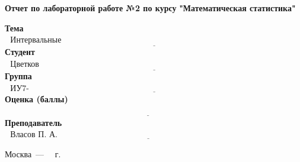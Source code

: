 \begin{titlepage}
	\begin{center}
		\noindent\begin{minipage}{1.3\textwidth}\centering
		\Large\textbf{Отчет по лабораторной работе №2 по курсу}\newline
		\textbf{"Математическая статистика"}\newline\newline\newline
		\end{minipage}
	\end{center}
	

	\noindent\textbf{Тема}           $\underline{\text{~~Интервальные оценки~~~~~~~~~~~~~~~~~~~~~~~~~~~~~~~~~~~~~~~~~~~~~~~~~~~~~~~~~~~~~~~~~~~~~~~~~~~~~~~~~~~~~~~~}}$\newline\newline
	\noindent\textbf{Студент}        $\underline{\text{~~Цветков И.А.~~~~~~~~~~~~~~~~~~~~~~~~~~~~~~~~~~~~~~~~~~~~~~~~~~~~~~~~~~~~~~~~~~~~~~~~~~~~~~~~~~~~~~~~~~~~~~~}}$\newline\newline
	\noindent\textbf{Группа}         $\underline{\text{~~ИУ7-63Б~~~~~~~~~~~~~~~~~~~~~~~~~~~~~~~~~~~~~~~~~~~~~~~~~~~~~~~~~~~~~~~~~~~~~~~~~~~~~~~~~~~~~~~~~~~~~~~~~~~~~~}}$\newline\newline
	\noindent\textbf{Оценка (баллы)} $\underline{\text{~~~~~~~~~~~~~~~~~~~~~~~~~~~~~~~~~~~~~~~~~~~~~~~~~~~~~~~~~~~~~~~~~~~~~~~~~~~~~~~~~~~~~~~~~~~~~~~~~~~~~~~~}}$\newline\newline
	\noindent\textbf{Преподаватель}  $\underline{\text{~~Власов П. А.~~~~~~~~~~~~~~~~~~~~~~~~~~~~~~~~~~~~~~~~~~~~~~~~~~~~~~~~~~~~~~~~~~~~~~~~~~~~~~~~~~~~~}}$\newline	
	\begin{center}
		\vfill
		Москва~---~\the\year
		~г.
	\end{center}
	\restoregeometry
\end{titlepage}


